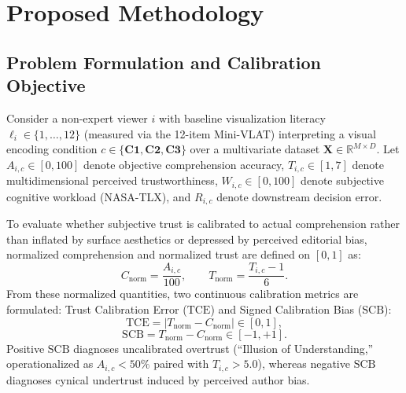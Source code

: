 \documentclass[conference]{IEEEtran}
\newcommand{\Tnorm}{T_{\mathrm{norm}}}
\newcommand{\Cnorm}{C_{\mathrm{norm}}}
\newcommand{\TCE}{\mathrm{TCE}}
\newcommand{\SCB}{\mathrm{SCB}}
\newcommand{\Ctwo}{\textbf{C2}}
\newcommand{\Cone}{\textbf{C1}}
\newcommand{\Cthree}{\textbf{C3}}
\begin{document}
\section{Proposed Methodology}
\label{sec:method}
\subsection{Problem Formulation and Calibration Objective}
Consider a non-expert viewer $i$ with baseline visualization literacy $\ell_i \in \{1,\dots,12\}$ (measured via the 12-item Mini-VLAT) interpreting a visual encoding condition $c \in \{\Cone, \Ctwo, \Cthree\}$ over a multivariate dataset $\mathbf{X} \in \mathbb{R}^{M \times D}$. Let $A_{i,c} \in [0,100]$ denote objective comprehension accuracy, $T_{i,c} \in [1,7]$ denote multidimensional perceived trustworthiness, $W_{i,c} \in [0,100]$ denote subjective cognitive workload (NASA-TLX), and $R_{i,c}$ denote downstream decision error.

To evaluate whether subjective trust is calibrated to actual comprehension rather than inflated by surface aesthetics or depressed by perceived editorial bias, normalized comprehension and normalized trust are defined on $[0,1]$ as:
\begin{equation}
\Cnorm = \frac{A_{i,c}}{100}, \qquad
\Tnorm = \frac{T_{i,c} - 1}{6}.
\label{eq:norm}
\end{equation}
From these normalized quantities, two continuous calibration metrics are formulated: Trust Calibration Error ($\TCE$) and Signed Calibration Bias ($\SCB$):
\begin{equation}
\TCE = \bigl|\Tnorm - \Cnorm\bigr| \in [0,1],
\label{eq:tce}
\end{equation}
\begin{equation}
\SCB = \Tnorm - \Cnorm \in [-1,+1].
\label{eq:scb}
\end{equation}
Positive $\SCB$ diagnoses uncalibrated overtrust (``Illusion of Understanding,'' operationalized as $A_{i,c} < 50\%$ paired with $T_{i,c} > 5.0$), whereas negative $\SCB$ diagnoses cynical undertrust induced by perceived author bias.
\end{document}
